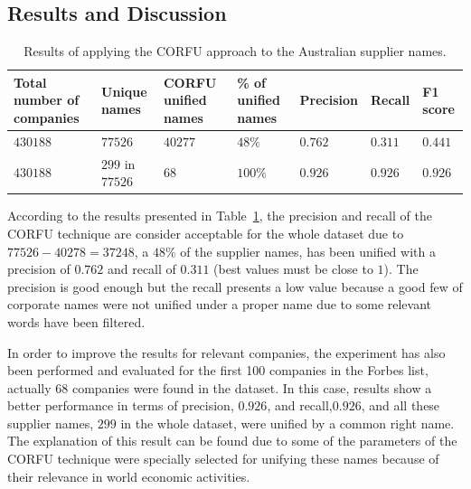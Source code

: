 \documentclass{llncs}
\begin{document}

\subsection{Results and Discussion}

\begin{table}[!h]
\renewcommand{\arraystretch}{1.3}
\begin{center}
\begin{tabular}{|p{2.5cm}|p{2cm}|p{1.5cm}|p{1.8cm}|l|l|l|}
\hline
  \textbf{Total number of companies} & \textbf{Unique names}& \textbf{CORFU unified names}& \textbf{\% of unified names} & \textbf{Precision} & \textbf{Recall} & \textbf{F1 score} \\  \hline
   $430188$ & $77526$ & $40277$  &$48\%$ & $0.762$ & $0.311$&$0.441$ \\ \hline   
   $430188$ & $299$ in $77526$ & $68$ & $100\%$&  $0.926$ & $0.926$ &$0.926$\\ \hline
  \hline
  \end{tabular}
  \caption{Results of applying the CORFU approach to the Australian supplier names.}
  \label{tabla:aus-results}
  \end{center}
\end{table} 


According to the results presented in Table~\ref{tabla:aus-results}, the precision 
and recall of the CORFU technique are consider acceptable for the whole dataset 
due to $77526-40278=37248$, a $48\%$ of the supplier names, has been unified with 
a precision of $0.762$ and recall of $0.311$ (best values must be close to $1$). 
The precision is good enough but the recall presents a low value because a good few of 
corporate names were not unified under a proper name due to some relevant 
words have been filtered.

In order to improve the results for relevant companies, the experiment has also 
been performed and evaluated for the first 100 companies in the Forbes list, actually $68$ companies were 
found in the dataset. In this case, results show a better performance in terms of precision, $0.926$, and recall,$0.926$, and 
all these supplier names, $299$ in the whole dataset, were unified by a common right name. 
The explanation of this result can be found due to some of the parameters of the CORFU technique were specially selected for unifying 
these names because of their relevance in world economic activities.
\end{document}
